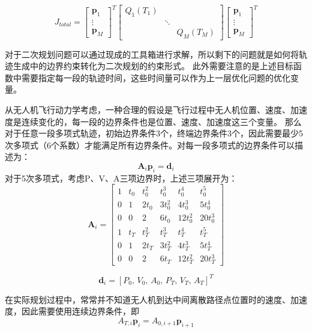 \begin{equation}
J_{total} = \begin{bmatrix} \bm{p}_1 \\ \vdots \\ \bm{p}_M \end{bmatrix}^T 
 \begin{bmatrix} Q_1(T_1) & & \\ & \ddots & \\ & & Q_M(T_M) \end{bmatrix}
 \begin{bmatrix} \bm{p}_1 \\ \vdots \\ \bm{p}_M \end{bmatrix}^T 
\end{equation}

对于二次规划问题可以通过现成的工具箱进行求解，所以剩下的问题就是如何将轨迹生成中的边界约束转化为二次规划的约束形式。
{\color{red}此外需要注意的是上述目标函数中需要指定每一段的轨迹时间，这些时间量可以作为上一层优化问题的优化变量。}

从无人机飞行动力学考虑，一种合理的假设是飞行过程中无人机位置、速度、加速度是连续变化的，每一段的边界条件也是位置、速度、加速度这三个变量。
那么对于任意一段多项式轨迹，初始边界条件3个，终端边界条件3个，因此需要最少5次多项式（6个系数）才能满足所有边界条件。对每一段多项式的边界条件可以描述为：
\begin{equation}
    \bm{A}_i \bm{p}_i = \bm{d}_i
\end{equation}
对于5次多项式，考虑P、V、A三项边界时，上述三项展开为：
\begin{equation}
    \bm{A}_i = \begin{bmatrix}
        1   & t_0   & t_0^2     & t_0^3     & t_0^4     & t_0^5 \\
        0   & 1     & 2 t_0     & 3 t_0^2   & 4 t_0^3   & 5 t_0^4 \\
        0   & 0     & 2         & 6 t_0     & 12 t_0^2  & 20 t_0^3 \\
        1   & t_T   & t_T^2     & t_T^3     & t_T^4     & t_T^5 \\
        0   & 1     & 2 t_T     & 3 t_T^2   & 4 t_T^3   & 5 t_T^4 \\
        0   & 0     & 2         & 6 t_T     & 12 t_T^2  & 20 t_T^3 
    \end{bmatrix}
\end{equation}

\begin{equation}
    \bm{d}_i = [P_0, \, V_0, \, A_0, \, P_T, \, V_T, \, A_T]^T
\end{equation}

在实际规划过程中，常常并不知道无人机到达中间离散路径点位置时的速度、加速度，因此需要使用连续边界条件，即
\begin{equation}
    A_{T,i} \bm{p}_i = A_{0,i+1} \bm{p}_{i+1}
\end{equation}




